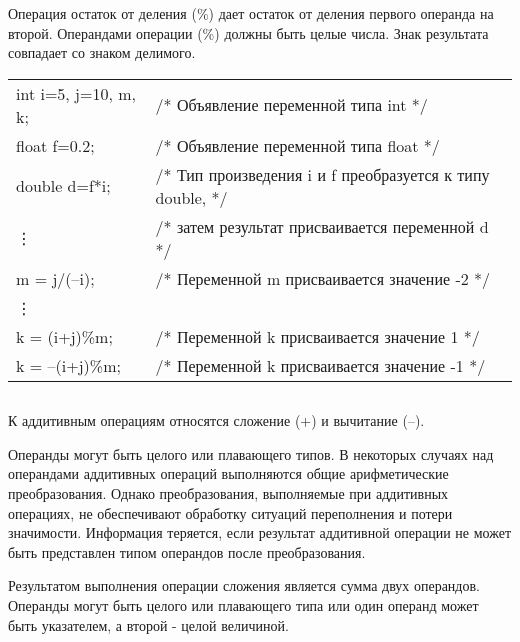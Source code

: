 Операция остаток от деления (\%) дает остаток от деления первого операнда на второй. Операндами операции (\%) должны быть целые числа. Знак результата совпадает со знаком делимого. \killoverfullbefore \BL

\begin{pExample}
\begin{tabular}{ l l }
int  i=5, j=10, m, k; & \textcolor{exComm}{/* Объявление переменной типа int */} \\
float f=0.2; & \textcolor{exComm}{/* Объявление переменной типа float */} \\
double d=f*i; & \textcolor{exComm}{/* Тип произведения i и f преобразуется к типу double, */} \\
\vdots  & \textcolor{exComm}{/* затем результат присваивается переменной d */} \\
m = j/({--}i); & \textcolor{exComm}{/* Переменной m присваивается значение -2 */} \\
\vdots  & \textcolor{exComm}{ } \\
k = (i+j)\%m; & \textcolor{exComm}{/* Переменной k присваивается значение 1 */} \\
k = {--}(i+j)\%m; & \textcolor{exComm}{/* Переменной k присваивается значение -1 */} \\
\end{tabular}
\end{pExample}

\subsection{}

К аддитивным операциям относятся сложение (+) и вычитание ({--}). \killoverfullbefore

Операнды могут быть целого или плавающего типов. В некоторых случаях над операндами аддитивных операций выполняются общие арифметические преобразования. Однако преобразования, выполняемые при аддитивных операциях, не обеспечивают обработку ситуаций переполнения и потери значимости. Информация теряется, если результат аддитивной операции не может быть представлен типом операндов после преобразования. \killoverfullbefore

Результатом выполнения операции сложения является сумма двух операндов. Операнды могут быть целого или плавающего типа или один операнд может быть указателем, а второй - целой величиной. \killoverfullbefore

